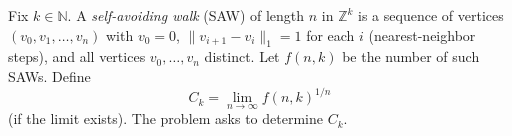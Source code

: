 Fix $k\in\mathbb N$.
A \emph{self-avoiding walk} (SAW) of length $n$ in $\mathbb Z^k$ is a sequence of vertices $(v_0,v_1,\dots,v_n)$ with $v_0=0$, $\|v_{i+1}-v_i\|_1=1$ for each $i$ (nearest-neighbor steps), and all vertices $v_0,\dots,v_n$ distinct.
Let $f(n,k)$ be the number of such SAWs.
Define
\[C_k = \lim_{n\to\infty} f(n,k)^{1/n}
\]
(if the limit exists). The problem asks to determine $C_k$.
